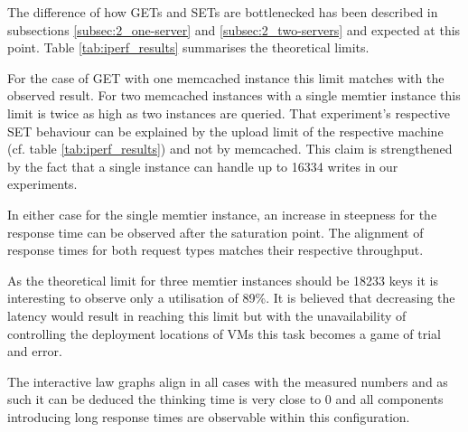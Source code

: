         The difference of how GETs and SETs are bottlenecked has been described in subsections \ref{subsec:2_one-server}
        and \ref{subsec:2_two-servers} and expected at this point. Table \ref{tab:iperf_results} summarises the
        theoretical limits.


        For the case of GET with one memcached instance this limit matches with the observed result. For two
        memcached instances with a single memtier instance this limit is twice as high as two instances are queried.
        That experiment's respective SET behaviour can be explained by the upload limit of the respective machine (cf.
        table \ref{tab:iperf_results}) and not by memcached. This claim is strengthened by the fact that a single
        instance can handle up to 16334 writes in our experiments.

        In either case for the single memtier instance, an increase in steepness for the response time can be
        observed after the saturation point. The alignment of response times for both request types matches their
        respective throughput.

        As the theoretical limit for three memtier instances should be 18233 keys it is interesting to observe only
        a utilisation of 89\%. It is believed that decreasing the latency would result in reaching this limit but
        with the unavailability of controlling the deployment locations of VMs this task becomes a game of trial and
        error.


        The interactive law graphs align in all cases with the measured numbers and as such it can be deduced the
        thinking time is very close to 0 and all components introducing long response times are observable within this
        configuration.
